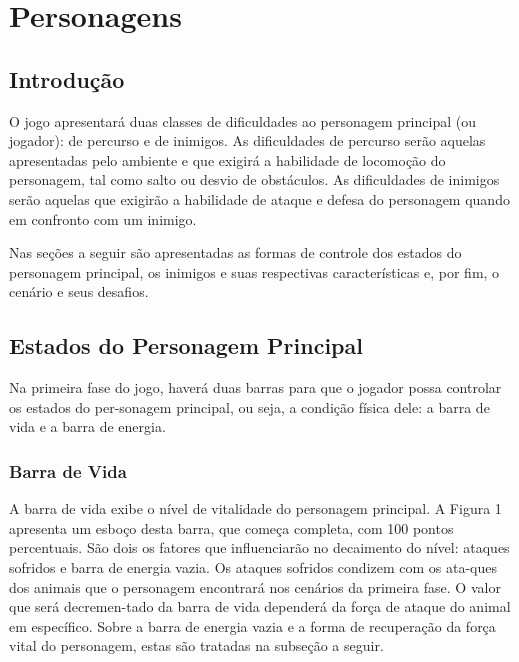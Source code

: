 \section{Personagens}

\subsection{Introdução}
O jogo apresentará duas classes de dificuldades ao personagem principal 
(ou jogador): de percurso e de inimigos. As dificuldades de percurso serão 
aquelas apresentadas pelo ambiente e que exigirá a habilidade de locomoção 
do personagem, tal como salto ou desvio de obstáculos. As dificuldades 
de inimigos serão aquelas que exigirão a habilidade de ataque e defesa 
do personagem quando em confronto com um inimigo.

Nas seções a seguir são apresentadas as formas de controle dos estados 
do personagem principal, os inimigos e suas respectivas características 
e, por fim, o cenário e seus desafios.

\subsection{Estados do Personagem Principal}
Na primeira fase do jogo, haverá duas barras para que o jogador possa 
controlar os estados do per-sonagem principal, ou seja, a condição física 
dele: a barra de vida e a barra de energia.
 
\subsubsection{Barra de Vida}
A barra de vida exibe o nível de vitalidade do personagem principal. 
A Figura 1 apresenta um esboço desta barra, que começa completa, com
100 pontos percentuais. São dois os fatores que influenciarão no 
decaimento do nível: ataques sofridos e barra de energia vazia. Os ataques 
sofridos condizem com os ata-ques dos animais que o personagem encontrará
nos cenários da primeira fase. O valor que será decremen-tado da barra de 
vida dependerá da força de ataque do animal em específico. Sobre a barra de 
energia vazia e a forma de recuperação da força vital do personagem, estas
são tratadas na subseção a seguir.

